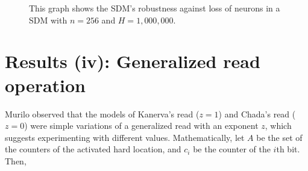 \begin{figure}[!p]
\centering
{}


\caption{This graph shows the SDM's robustness against loss of neurons in a SDM with $n=256$ and $H=1,000,000$.
\label{fig:sdm-neuron-death-256bits}}
\end{figure}


\chapter{Results (iv): Generalized read operation}

Murilo observed that the models of Kanerva's read ($z=1$) and Chada's read ($z=0$) were simple variations of a generalized read with an exponent $z$, which suggests experimenting with different values. Mathematically, let $A$ be the set of the counters of the activated hard location, and $c_i$ be the counter of the $i$th bit. Then,

